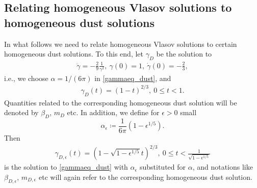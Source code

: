 \documentclass[11pt]{article}
\begin{document}
\subsection{Relating homogeneous Vlasov solutions to homogeneous dust solutions}
\label{subsec_homvleps}
%
%
In what follows we need to relate homogeneous Vlasov solutions
to certain homogeneous dust solutions. To this end, let $\gamma_D$ be
the solution to
\begin{align}\label{gammaD_eq}
  \ddot \gamma = - \frac{2}{9}  \frac{1}{\gamma^2},\
  \gamma(0)=1,\ \dot \gamma(0) = - \frac{2}{3},
\end{align}
i.e., we choose $\alpha=1/(6\pi)$ in \eqref{gammaeq_dust}, and
\begin{align} \label{gammaD}
  \gamma_D(t) = (1-t)^{2/3},\ 0\leq t < 1.
\end{align}
Quantities related to the corresponding homogeneous dust solution
will be denoted by $\beta_D$, $m_D$ etc.
In addition, we define for $\epsilon>0$ small
\[
\alpha_\epsilon \coloneqq \frac{1}{6\pi} (1-\epsilon^{1/5}).
\]
Then
\begin{align} \label{gammaDe}
  \gamma_{D,\epsilon}(t) = (1-\sqrt{1-\epsilon^{1/5}} t)^{2/3},\ 0\leq t <
  \frac{1}{\sqrt{1-\epsilon^{1/5}}}
\end{align}
is the solution to \eqref{gammaeq_dust} with $\alpha_\epsilon$ substituted
for $\alpha$, and notations like $\beta_{D,\epsilon}$, $m_{D,\epsilon}$ etc
will again refer to the corresponding homogeneous dust solution. 
\end{document}
